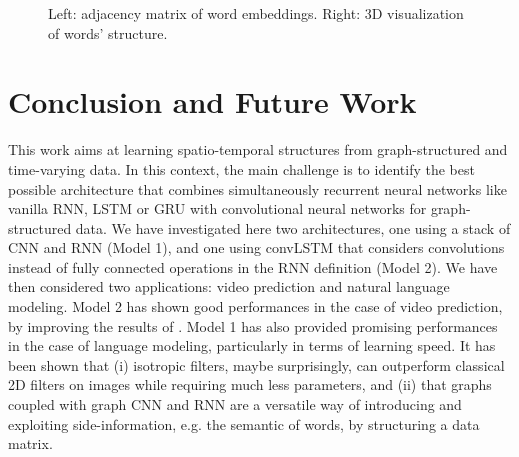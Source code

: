 \documentclass{article}
\begin{document}
\begin{figure}[t]
	\centering
	\hspace{0.5cm}
	\vspace{-0.6cm}
	\caption{Left: adjacency matrix of word embeddings. Right: 3D visualization of words' structure.}
	\label{fig2}
\end{figure}

\section{Conclusion and Future Work}

This work aims at learning spatio-temporal structures from graph-structured and
time-varying data. In this context, the main challenge is to identify the best
possible architecture that combines simultaneously recurrent neural networks
like vanilla RNN, LSTM or GRU with convolutional neural networks for
graph-structured data. We have investigated here two architectures, one using a
stack of CNN and RNN (Model 1), and one using convLSTM that considers
convolutions instead of fully connected operations in the RNN definition (Model
2). We have then considered two applications: video prediction and natural
language modeling. Model 2 has shown good performances in the case of video
prediction, by improving the results of \citet{convlstm}. Model 1 has also
provided promising performances in the case of language modeling, particularly
in terms of learning speed. It has been shown that (i) isotropic filters, maybe
surprisingly, can outperform classical 2D filters on images while requiring
much less parameters, and (ii) that graphs coupled with graph CNN and RNN are a
versatile way of introducing and exploiting side-information, e.g. the semantic
of words, by structuring a data matrix.
\end{document}
